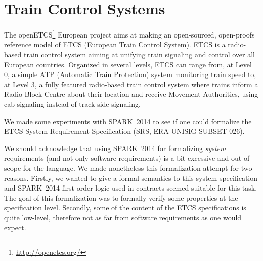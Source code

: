 \documentclass[10pt,a4paper,twocolumn]{article}
\newcommand{\DOC}{\textsc{do-178c}\xspace}
\newcommand{\newspark}{SPARK~2014\xspace}
\begin{document}

\section{Train Control Systems}


The openETCS\footnote{\url{http://openetcs.org/}} European project
aims at making an open-sourced, open-proofs reference model of ETCS
(European Train Control System). ETCS is a radio-based train control
system aiming at unifying train signaling and control over all
European countries. Organized in several levels, ETCS can range from,
at Level 0, a simple ATP (Automatic Train Protection) system
monitoring train speed to, at Level 3, a fully featured radio-based
train control system where trains inform a Radio Block Centre about
their location and receive Movement Authorities, using cab signaling
instead of track-side signaling.

We made some experiments with \newspark to see if one could formalize
the ETCS System Requirement Specification (SRS, ERA UNISIG
SUBSET-026).

We should acknowledge that using \newspark for formalizing
\emph{system} requirements (and not only software requirements) is a
bit excessive and out of scope for the language. We made nonetheless
this formalization attempt for two reasons. Firstly, we wanted to give
a formal semantics to this system specification and \newspark
first-order logic used in contracts seemed suitable for
this task. The goal of this formalization was to formally verify some
properties at the specification level.  Secondly, some of
the content of the ETCS specifications is quite low-level, therefore
not as far from software requirements as one would expect.
\end{document}
